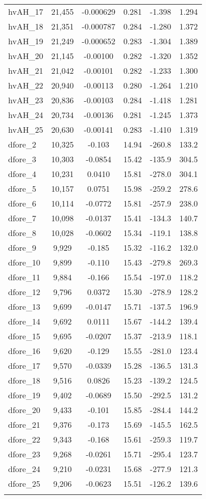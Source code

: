 \begin{tabular}{lccccc}
hvAH\_17 & 21,455 & -0.000629 & 0.281 & -1.398 & 1.294 \\
hvAH\_18 & 21,351 & -0.000787 & 0.284 & -1.280 & 1.372 \\
hvAH\_19 & 21,249 & -0.000652 & 0.283 & -1.304 & 1.389 \\
hvAH\_20 & 21,145 & -0.00100 & 0.282 & -1.320 & 1.352 \\
hvAH\_21 & 21,042 & -0.00101 & 0.282 & -1.233 & 1.300 \\
hvAH\_22 & 20,940 & -0.00113 & 0.280 & -1.264 & 1.210 \\
hvAH\_23 & 20,836 & -0.00103 & 0.284 & -1.418 & 1.281 \\
hvAH\_24 & 20,734 & -0.00136 & 0.281 & -1.245 & 1.373 \\
hvAH\_25 & 20,630 & -0.00141 & 0.283 & -1.410 & 1.319 \\
dfore\_2 & 10,325 & -0.103 & 14.94 & -260.8 & 133.2 \\
dfore\_3 & 10,303 & -0.0854 & 15.42 & -135.9 & 304.5 \\
dfore\_4 & 10,231 & 0.0410 & 15.81 & -278.0 & 304.1 \\
dfore\_5 & 10,157 & 0.0751 & 15.98 & -259.2 & 278.6 \\
dfore\_6 & 10,114 & -0.0772 & 15.81 & -257.9 & 238.0 \\
dfore\_7 & 10,098 & -0.0137 & 15.41 & -134.3 & 140.7 \\
dfore\_8 & 10,028 & -0.0602 & 15.34 & -119.1 & 138.8 \\
dfore\_9 & 9,929 & -0.185 & 15.32 & -116.2 & 132.0 \\
dfore\_10 & 9,899 & -0.110 & 15.43 & -279.8 & 269.3 \\
dfore\_11 & 9,884 & -0.166 & 15.54 & -197.0 & 118.2 \\
dfore\_12 & 9,796 & 0.0372 & 15.30 & -278.9 & 128.2 \\
dfore\_13 & 9,699 & -0.0147 & 15.71 & -137.5 & 196.9 \\
dfore\_14 & 9,692 & 0.0111 & 15.67 & -144.2 & 139.4 \\
dfore\_15 & 9,695 & -0.0207 & 15.37 & -213.9 & 118.1 \\
dfore\_16 & 9,620 & -0.129 & 15.55 & -281.0 & 123.4 \\
dfore\_17 & 9,570 & -0.0339 & 15.28 & -136.5 & 131.3 \\
dfore\_18 & 9,516 & 0.0826 & 15.23 & -139.2 & 124.5 \\
dfore\_19 & 9,402 & -0.0689 & 15.50 & -292.5 & 131.2 \\
dfore\_20 & 9,433 & -0.101 & 15.85 & -284.4 & 144.2 \\
dfore\_21 & 9,376 & -0.173 & 15.69 & -145.5 & 162.5 \\
dfore\_22 & 9,343 & -0.168 & 15.61 & -259.3 & 119.7 \\
dfore\_23 & 9,268 & -0.0261 & 15.71 & -295.4 & 123.7 \\
dfore\_24 & 9,210 & -0.0231 & 15.68 & -277.9 & 121.3 \\
dfore\_25 & 9,206 & -0.0623 & 15.51 & -126.2 & 139.6 \\
 &  &  &  &  &  \\ \hline
\end{tabular}
